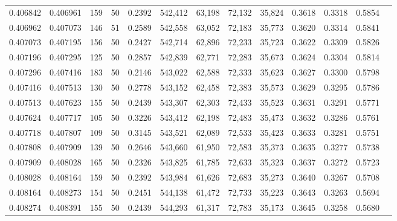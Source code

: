 \begin{tabular}{rrrrrrrrrrrrr}
0.406842 & 0.406961 &   159 &  50 &                                     0.2392 & 542,412 &  63,198 &  72,132 &  35,824 & 0.3618 & 0.3318 & 0.5854 \\
0.406962 & 0.407073 &   146 &  51 &                                     0.2589 & 542,558 &  63,052 &  72,183 &  35,773 & 0.3620 & 0.3314 & 0.5841 \\
0.407073 & 0.407195 &   156 &  50 &                                     0.2427 & 542,714 &  62,896 &  72,233 &  35,723 & 0.3622 & 0.3309 & 0.5826 \\
0.407196 & 0.407295 &   125 &  50 &                                     0.2857 & 542,839 &  62,771 &  72,283 &  35,673 & 0.3624 & 0.3304 & 0.5814 \\
0.407296 & 0.407416 &   183 &  50 &                                     0.2146 & 543,022 &  62,588 &  72,333 &  35,623 & 0.3627 & 0.3300 & 0.5798 \\
0.407416 & 0.407513 &   130 &  50 &                                     0.2778 & 543,152 &  62,458 &  72,383 &  35,573 & 0.3629 & 0.3295 & 0.5786 \\
0.407513 & 0.407623 &   155 &  50 &                                     0.2439 & 543,307 &  62,303 &  72,433 &  35,523 & 0.3631 & 0.3291 & 0.5771 \\
0.407624 & 0.407717 &   105 &  50 &                                     0.3226 & 543,412 &  62,198 &  72,483 &  35,473 & 0.3632 & 0.3286 & 0.5761 \\
0.407718 & 0.407807 &   109 &  50 &                                     0.3145 & 543,521 &  62,089 &  72,533 &  35,423 & 0.3633 & 0.3281 & 0.5751 \\
0.407808 & 0.407909 &   139 &  50 &                                     0.2646 & 543,660 &  61,950 &  72,583 &  35,373 & 0.3635 & 0.3277 & 0.5738 \\
0.407909 & 0.408028 &   165 &  50 &                                     0.2326 & 543,825 &  61,785 &  72,633 &  35,323 & 0.3637 & 0.3272 & 0.5723 \\
0.408028 & 0.408164 &   159 &  50 &                                     0.2392 & 543,984 &  61,626 &  72,683 &  35,273 & 0.3640 & 0.3267 & 0.5708 \\
0.408164 & 0.408273 &   154 &  50 &                                     0.2451 & 544,138 &  61,472 &  72,733 &  35,223 & 0.3643 & 0.3263 & 0.5694 \\
0.408274 & 0.408391 &   155 &  50 &                                     0.2439 & 544,293 &  61,317 &  72,783 &  35,173 & 0.3645 & 0.3258 & 0.5680 \\

\end{tabular}
